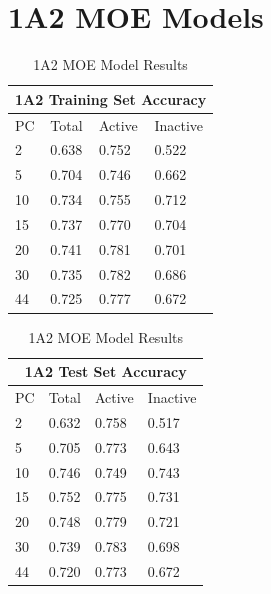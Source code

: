 
\section{1A2 MOE Models}

\begin{table}[H]
\caption{1A2 MOE Model Results}
\begin{minipage}{.5\linewidth}
\centering
\begin{tabular}{|l|l|l|l|}
\hline
\multicolumn{4}{|c|}{1A2 Training Set Accuracy}   \\ \hline
PC & Total          & Active          & Inactive  \\ \hline
2  & 0.638          & 0.752           & 0.522     \\ \hline
5  & 0.704          & 0.746           & 0.662     \\ \hline
10 & 0.734          & 0.755           & 0.712     \\ \hline
15 & 0.737          & 0.770           & 0.704     \\ \hline
20 & 0.741          & 0.781           & 0.701     \\ \hline
30 & 0.735          & 0.782           & 0.686     \\ \hline
44 & 0.725          & 0.777           & 0.672     \\ \hline
\end{tabular}
\end{minipage}
\begin{minipage}{.5\linewidth}
\centering
\begin{tabular}{|l|l|l|l|}
\hline
\multicolumn{4}{|c|}{1A2 Test Set Accuracy}     \\ \hline
PC & Total          & Active          & Inactive \\ \hline
2  & 0.632          & 0.758           & 0.517   \\ \hline
5  & 0.705          & 0.773           & 0.643   \\ \hline
10 & 0.746          & 0.749           & 0.743   \\ \hline
15 & 0.752          & 0.775           & 0.731   \\ \hline
20 & 0.748          & 0.779           & 0.721   \\ \hline
30 & 0.739          & 0.783           & 0.698   \\ \hline
44 & 0.720          & 0.773           & 0.672   \\ \hline
\end{tabular}
\end{minipage}
\end{table}

